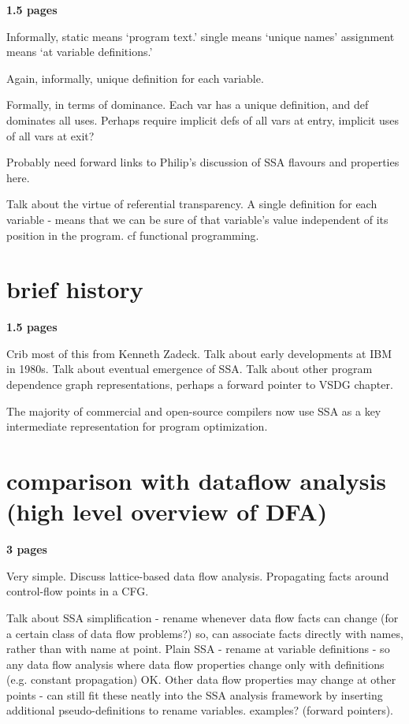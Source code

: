 \textbf{1.5 pages}

Informally, static means `program text.'
single means `unique names'
assignment means `at variable definitions.'

Again, informally, unique definition for each variable.

Formally, in terms of dominance. Each var has a unique
definition, and def dominates all uses.
Perhaps require implicit defs of all vars at entry,
implicit uses of all vars at exit?

Probably need forward links to Philip's discussion of
SSA flavours and properties here.

Talk about the virtue of referential transparency. A single
definition for each variable - means that we can be sure
of that variable's value independent of its
position in the program. cf functional programming.


\section{brief history}

\textbf{1.5 pages}

Crib most of this from Kenneth Zadeck. 
Talk about early developments at IBM in 1980s.
Talk about eventual emergence of SSA.
Talk about other program dependence graph
representations, perhaps a forward pointer to 
VSDG chapter.

The majority of commercial and open-source compilers
now use SSA as a key intermediate representation for
program optimization.


\section{comparison with dataflow analysis (high level overview of DFA)}

\textbf{3 pages}

Very simple. Discuss lattice-based data flow analysis.
Propagating facts around control-flow points in a CFG.

Talk about SSA simplification - rename whenever data flow
facts can change (for a certain class of data flow problems?)
so, can associate facts directly with names, rather than with
name at point.
Plain SSA - rename at variable definitions - so any data flow
analysis where data flow properties change only with definitions
(e.g. constant propagation) OK. Other data flow properties may 
change at other points - can still fit these neatly into the SSA
analysis framework by inserting additional pseudo-definitions
to rename variables. examples? (forward pointers).


